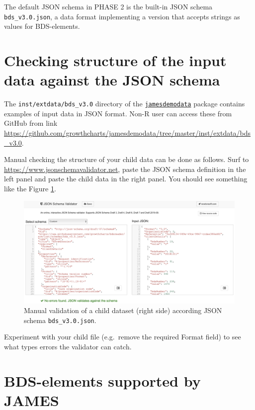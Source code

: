 \documentclass[
]{book}
\begin{document}
The default JSON schema in PHASE 2 is the built-in JSON schema \texttt{bds\_v3.0.json}, a data format implementing a version that accepts strings as values for BDS-elements.

\hypertarget{checking-structure-of-the-input-data-against-the-json-schema}{%
\section{Checking structure of the input data against the JSON schema}\label{checking-structure-of-the-input-data-against-the-json-schema}}

The \texttt{inst/extdata/bds\_v3.0} directory of the \href{https://github.com/growthcharts/jamesdemodata}{\texttt{jamesdemodata}} package contains examples of input data in JSON format. Non-R user can access these from GitHub from link \url{https://github.com/growthcharts/jamesdemodata/tree/master/inst/extdata/bds_v3.0}.

Manual checking the structure of your child data can be done as follows. Surf to \url{https://www.jsonschemavalidator.net}, paste the JSON schema definition in the left panel and paste the child data in the right panel. You should see something like the Figure \ref{fig:jsonschema}.

\begin{figure}
\centering
\includegraphics{fig/JSON-schema-validator.png}
\caption{\label{fig:jsonschema}Manual validation of a child dataset (right side) according JSON schema \texttt{bds\_v3.0.json}.}
\end{figure}



Experiment with your child file (e.g.~remove the required Format field) to see what types errors the validator can catch.

\hypertarget{bds-elements-supported-by-james}{%
\section{BDS-elements supported by JAMES}\label{bds-elements-supported-by-james}}
\end{document}
